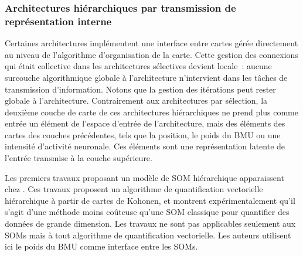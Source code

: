 \documentclass[../main]{subfiles}
\begin{document}
\subsubsection{Architectures hiérarchiques par transmission de représentation interne}

Certaines architectures implémentent une interface entre cartes gérée directement au niveau de l'algorithme d'organisation de la carte.
Cette gestion des connexions qui était collective dans les architectures sélectives devient locale~: aucune surcouche algorithmique globale à l'architecture n'intervient dans les tâches de transmission d'information. Notons que la gestion des itérations peut rester globale à l'architecture.
Contrairement aux architectures par sélection, la deuxième couche de carte de ces architectures hiérarchiques ne prend plus comme entrée un élément de l'espace d'entrée de l'architecture, mais des éléments des cartes des couches précédentes, tels que la position, le poids du BMU ou une intensité d'activité neuronale. 
Ces éléments sont une représentation latente de l'entrée transmise à la couche supérieure.


Les premiers travaux proposant un modèle de SOM hiérarchique apparaissent chez \cite{luttrell_hierarchical_1989}. 
Ces travaux proposent un algorithme de quantification vectorielle hiérarchique à partir de cartes de Kohonen, et montrent expérimentalement qu'il s'agit d'une méthode moins coûteuse qu'une SOM classique pour quantifier des données de grande dimension. Les travaux ne sont pas applicables seulement aux SOMs mais à tout algorithme de quantification vectorielle. Les auteurs utilisent ici le poids du BMU comme interface entre les SOMs.
\end{document}
